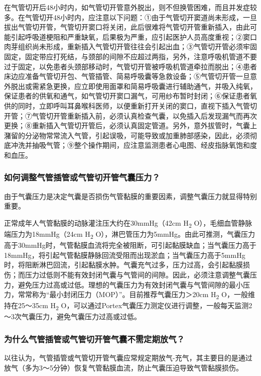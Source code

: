 在气管切开后48小时内，如气管切开管意外脱出，则不但换管困难，而且并发症较多。在气管切开48小时内，应注意以下问题：①由于气管切开窦道尚未形成，一旦拔出气管切开管，气管切开窦口将关闭，此后很难将气管切开管重新插入，由此可能引起呼吸道梗阻和严重缺氧，后果极为严重，应引起医护人员高度重视；②窦口肉芽组织尚未形成，重新插入气管切开管往往会引起出血；③气管切开管必须牢固固定，固定带应打死结，与颈部的间隙不应超过两指，另外，注意呼吸机管道不要过于固定，以免患者头颈部移动时，气管切开管被呼吸机管道牵拉而脱出；④患者床边应准备气管切开包、气管插管、简易呼吸囊等急救设备；⑤气管切开管一旦意外脱出或需紧急更换，应立即使用面罩和简易呼吸囊进行辅助通气，并吸入纯氧，保证患者的供氧和通气，如气管切开窦口漏气，可用纱布暂时封闭；⑥保证患者氧供的同时，立即呼叫耳鼻喉科医师，以便重新打开关闭的窦口，直视下插入气管切开管；⑦气管切开管重新插入前，必须认真检查气囊，以免插入后发现漏气而再次更换；⑧重新插入气管切开管后，必须认真固定管道。另外，意外拔管时，气囊上潴留的分泌物常常流入气管，引起误吸，可能导致或加重肺部感染，因此，必须彻底冲洗并抽吸气管；⑨整个操作期间，应注意监测患者心电图、经皮指脉氧饱和度和血压。

\subsubsection{如何调整气管插管或气管切开管气囊压力？}

由于气囊压力是决定气囊是否损伤气管黏膜的重要因素，调整气囊压力就显得特别重要。

正常成年人气管黏膜的动脉灌注压大约在30mmHg（42cm H\textsubscript{2}
O），毛细血管静脉端压力为18mmHg（24cm H\textsubscript{2}
O），淋巴管压力为5mmHg。由此可推测，气囊压力高于30mmHg时，气管黏膜血流将完全被阻断，可引起黏膜缺血；当气囊压力高于18mmHg，将引起气管黏膜静脉回流受阻而出现淤血；当气囊压力高于5mmHg时，将阻断淋巴回流，引起黏膜水肿。气囊充气过多，压力过高，会引起黏膜损伤；而压力过低则不能有效封闭气囊与气管间的间隙。因此，必须注意调整气囊压力，避免压力过高或过低。理想的气囊压力为有效封闭气囊与气管间隙的最小压力，常常称为“最小封闭压力（MOP）”。目前推荐气囊压力＞20cm
H\textsubscript{2} O，一般维持在25～35cm H\textsubscript{2}
O，可以通过Portex气囊压力测定仪进行调整，一般每天监测2～3次气囊压力，避免气囊压力过高或过低。

\subsubsection{为什么气管插管或气管切开管气囊不需定期放气？}

以往认为，气管插管或气管切开管气囊应常规定期放气-充气，其主要目的是通过放气（多为3～5分钟）恢复气管黏膜血流，防止气囊压迫导致气管黏膜损伤。

